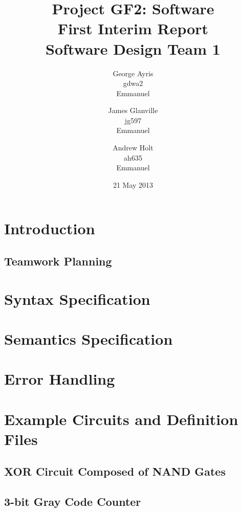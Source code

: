 \documentclass[a4paper,11pt]{article}  %
\title{Project GF2: Software\\ First Interim Report\\ Software Design
  Team 1}
\author{George Ayris\\ gdwa2\\ Emmanuel \and James Glanville\\
jg597\\ Emmanuel \and Andrew Holt\\ ah635\\ Emmanuel}
\date{21 May 2013}
\begin{document}
\maketitle

\section{Introduction}

\subsection{Teamwork Planning}

\section{Syntax Specification}

\section{Semantics Specification}

\section{Error Handling}

\section{Example Circuits and Definition Files}

\subsection{XOR Circuit Composed of NAND Gates}

\subsection{3-bit Gray Code Counter}
\end{document}
